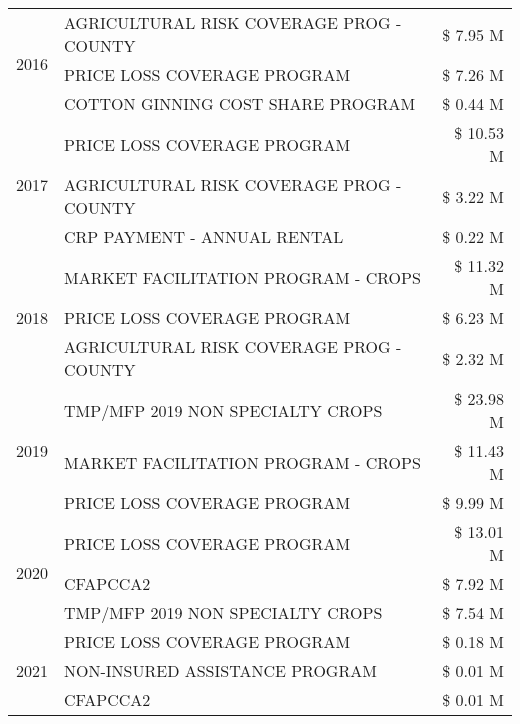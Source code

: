 \begin{tabular}{llr}
\multirow[t]{3}{*}{2016} & AGRICULTURAL RISK COVERAGE PROG - COUNTY      & \$ 7.95 M \\
 & PRICE LOSS COVERAGE PROGRAM                   & \$ 7.26 M \\
 & COTTON GINNING COST SHARE PROGRAM             & \$ 0.44 M \\
\cline{1-3}
\multirow[t]{3}{*}{2017} & PRICE LOSS COVERAGE PROGRAM & \$ 10.53 M \\
 & AGRICULTURAL RISK COVERAGE PROG - COUNTY & \$ 3.22 M \\
 & CRP PAYMENT - ANNUAL RENTAL & \$ 0.22 M \\
\cline{1-3}
\multirow[t]{3}{*}{2018} & MARKET FACILITATION PROGRAM - CROPS & \$ 11.32 M \\
 & PRICE LOSS COVERAGE PROGRAM & \$ 6.23 M \\
 & AGRICULTURAL RISK COVERAGE PROG - COUNTY & \$ 2.32 M \\
\cline{1-3}
\multirow[t]{3}{*}{2019} & TMP/MFP 2019 NON SPECIALTY CROPS & \$ 23.98 M \\
 & MARKET FACILITATION PROGRAM - CROPS & \$ 11.43 M \\
 & PRICE LOSS COVERAGE PROGRAM & \$ 9.99 M \\
\cline{1-3}
\multirow[t]{3}{*}{2020} & PRICE LOSS COVERAGE PROGRAM & \$ 13.01 M \\
 & CFAPCCA2 & \$ 7.92 M \\
 & TMP/MFP 2019 NON SPECIALTY CROPS & \$ 7.54 M \\
\cline{1-3}
\multirow[t]{3}{*}{2021} & PRICE LOSS COVERAGE PROGRAM & \$ 0.18 M \\
 & NON-INSURED ASSISTANCE PROGRAM & \$ 0.01 M \\
 & CFAPCCA2 & \$ 0.01 M \\
\cline{1-3}
\bottomrule
\end{tabular}
